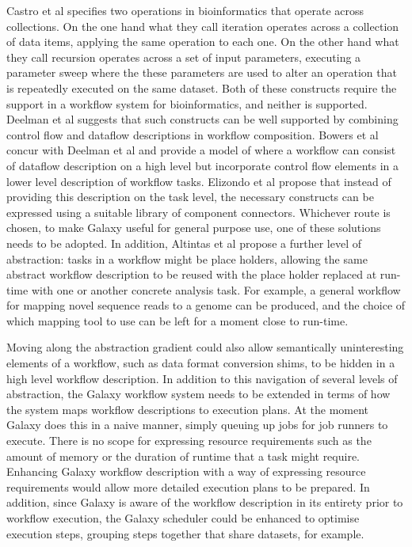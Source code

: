 \documentclass[a4paper,10pt]{scrreprt} \usepackage[utf8]{inputenc}
\begin{document}
Castro et al \cite{castro_workflows_2005} specifies two operations in bioinformatics that operate across collections. On the one hand what they call iteration operates across a collection of data items, applying the same operation to each one. On the other hand what they call recursion operates across a set of input parameters, executing a parameter sweep where the these parameters are used to alter an operation that is repeatedly executed on the same dataset. Both of these constructs require the support in a workflow system for bioinformatics, and neither is supported. Deelman et al \cite{deelman_workflows_2009} suggests that such constructs can be well supported by combining control flow and dataflow descriptions in workflow composition. Bowers et al \cite{bowers_enabling_2006} concur with Deelman et al and provide a model of where a workflow can consist of dataflow description on a high level but incorporate control flow elements in a lower level description of workflow tasks. 
Elizondo et al \cite{velasco_elizondo_catalogue_2010} propose that instead of providing this description on the task level, the necessary constructs can be expressed using a suitable library of component connectors. Whichever route is chosen, to make Galaxy useful for general purpose use, one of these solutions needs to be adopted. In addition, Altintas et al \cite{altintas_framework_2005} propose a further level of abstraction: tasks in a workflow might be place holders, allowing the same abstract workflow description to be reused with the place holder replaced at run-time with one or another concrete analysis task. For example, a general workflow for mapping novel sequence reads to a genome can be produced, and the choice of which mapping tool to use can be left for a moment close to run-time.

Moving along the abstraction gradient could also allow semantically uninteresting elements of a workflow, such as data format conversion shims, to be hidden in a high level workflow description. In addition to this navigation of several levels of abstraction, the Galaxy workflow system needs to be extended in terms of how the system maps workflow descriptions to execution plans. At the moment Galaxy does this in a naive manner, simply queuing up jobs for job runners to execute. There is no scope for expressing resource requirements such as the amount of memory or the duration of runtime that a task might require. Enhancing Galaxy workflow description with a way of expressing resource requirements would allow more detailed execution plans to be prepared. In addition, since Galaxy is aware of the workflow description in its entirety prior to workflow execution, the Galaxy scheduler could be enhanced to optimise execution steps, grouping steps together that share datasets, for example.
\end{document}
